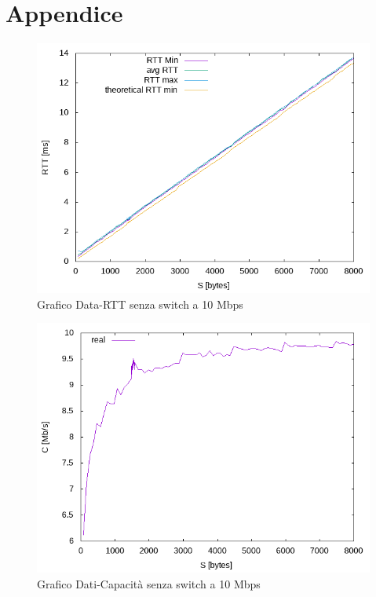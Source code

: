 \documentclass{exam}
\begin{document}
\section*{Appendice}
\begin{figure}[H]
	\centering
	\includegraphics[scale = 0.75]{No_Switch/RTT-10Mbps.png}
	\caption{Grafico Data-RTT senza switch a 10 Mbps}
	\label{fig:2.1RTT}
\end{figure}

\begin{figure}[H]
	\centering
	\includegraphics[scale = 0.75]{No_Switch/speed-10Mbps.png}
	\caption{Grafico Dati-Capacità senza switch a 10 Mbps}
	\label{fig:2.1Speed}
\end{figure}
\end{document}
